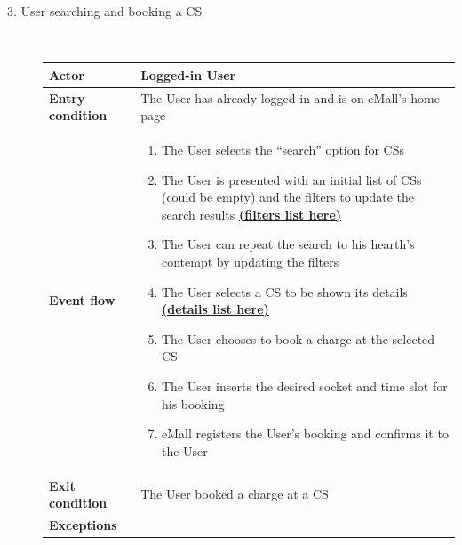 \documentclass[11pt]{article}
\begin{document}
\begin{description}
    \item [3. User searching and booking a CS] \hfill \\
    \begin{table}[H]
        \centering
        \setlength{\tabcolsep}{18pt}
        \renewcommand{\arraystretch}{1.4}
        \begin{tabularx}{\textwidth}{|>{\hsize=0.5\hsize}X|>{\hsize=1.5\hsize}X|}
            \hline
            \textbf{Actor} & Logged-in User \\
            \hline
            \textbf{Entry condition} & The User has already logged in and is on eMall's home page \\
            \hline
            \textbf{Event flow} & 
                \begin{minipage}[t]{\hsize}
                \begin{enumerate}[topsep=0pt, leftmargin=*]
                    \item The User selects the “search” option for CSs  
                    \item The User is presented with an initial list of CSs (could be empty) and the filters to update the search results \hyperref[scenario:lookingForCS]{\textbf{(filters list here)}}
                    \item The User can repeat the search to his hearth's contempt by updating the filters
                    \item The User selects a CS to be shown its details \hyperref[scenario:lookingForCS]{\textbf{(details list here)}}
                    \item The User chooses to book a charge at the selected CS
                    \item The User inserts the desired socket and time slot for his booking
                    \item eMall registers the User's booking and confirms it to the User
                \end{enumerate}
                \end{minipage}
                \vspace{6pt}
            \\
            \hline
            \textbf{Exit condition} & The User booked a charge at a CS \\
            \hline
            \textbf{Exceptions} & 

\end{tabularx}
\end{table}
\end{description}
\end{document}
